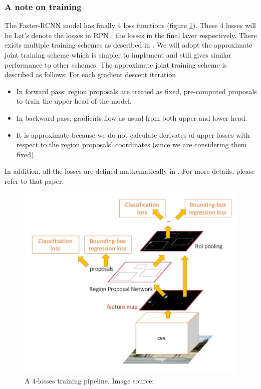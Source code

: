 \subsubsection{A note on training}
The Faster-RCNN model has finally 4 loss functions (figure \ref{fig:lossFasterRCNN}). These 4 losses will be Let's denote the losses in RPN ; the losses in the final layer  respectively. There exists multiple training schemes as described in \cite{DBLP:journals/corr/RenHG015}. We will adopt the approximate joint training scheme which is simpler to implement and still gives similar performance to other schemes. The approximate joint training scheme is described as follows: 
For each gradient descent iteration
\begin{itemize}
	\item In forward pass: region proposals are treated as fixed, pre-computed proposals to train the upper head of the model.
	\item In backward pass: gradients flow as usual from both upper and lower head. 
	\item It is approximate because we do not calculate derivates of upper losses with respect to the region proposals' coordinates (since we are considering them fixed).
\end{itemize}
In addition, all the losses are defined mathematically in \cite{DBLP:journals/corr/RenHG015}. For more details, please refer to that paper.

\begin{figure}[tb]
	\centering
	\includegraphics[width=0.8\hsize]{./figures/lossFasterRCNN}
	\caption{A 4-losses training pipeline. Image source: \cite{cs231n}}
	\label{fig:lossFasterRCNN}
\end{figure}

